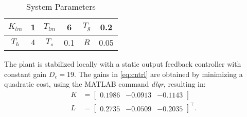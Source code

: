 \begin{table}
\centering
\begin{tabular}{||c | c || c | c|| c | c ||} 
 \hline
 $K_{lm}$ & 1 & $T_{lm}$ & 6 &  $T_g$ & 0.2 \\
 \hline
 $T_{h}$ & $4$ & $T_s$ & 0.1 & $R$ & 0.05\\
 \hline
\end{tabular}
\caption{System Parameters}
\label{param}
\end{table}


The plant is stabilized locally with a static output feedback controller with constant gain $D_c=19$. The gains in \eqref{eq:cntrl} are obtained by minimizing a quadratic cost, using the MATLAB command \emph{dlqr}, resulting in:
\begin{align}
    K&=\begin{bmatrix}
        0.1986  & -0.0913  & -0.1143
    \end{bmatrix}\\
    L &= \begin{bmatrix}
       0.2735 &  -0.0509 & -0.2035
    \end{bmatrix}^\top.
\end{align}

